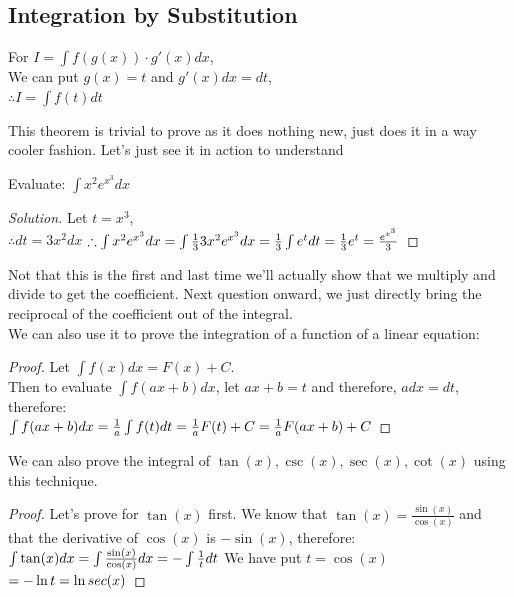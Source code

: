\subsection{Integration by Substitution}
\begin{theorem}
    For $I = \int f(g(x)) \cdot g'(x) dx$,\\
    We can put $g(x)=t$ and $g'(x)dx=dt$,\\
    $\therefore I= \int f(t)dt$
\end{theorem}
This theorem is trivial to prove as it does nothing new, just does it in a way cooler fashion. Let's just see it in action to understand\\
\begin{example}
    Evaluate: $\int x^2 e^{x^3} dx$
\end{example}
\begin{proof}
    [Solution]
    Let $t=x^3$,\\
    $\therefore dt=3x^2dx$
    $\therefore \int x^2 e^{x^3} dx\\
    = \int \frac{1}{3} 3x^2 e^{x^3} dx\\
 = \frac{1}{3} \int e^t dt\\
 = \frac{1}{3} e^t\\
 =\frac{e^{x^3}}{3}$
\end{proof}
Not that this is the first and last time we'll actually show that we multiply and divide to get the coefficient. Next question onward, we just directly bring the reciprocal of the coefficient out of the integral.\\
We can also use it to prove the integration of a function of a linear equation:\\
\begin{proof}
    Let $\int f(x) dx = F(x)+C$.\\
    Then to evaluate $\int f(ax+b) dx$, let $ax+b=t$ and therefore, $adx=dt$, therefore:\\
    $\int f(ax+b) dx\\
    = \frac{1}{a}\int f(t) dt\\
    = \frac{1}{a} F(t) +C\\
    = \frac{1}{a} F(ax+b) + C$
\end{proof}
We can also prove the integral of $\tan(x), \csc(x), \sec(x), \cot(x)$ using this technique.\\
\begin{proof}
    Let's prove for $\tan(x)$ first. We know that $\tan(x)=\frac{\sin(x)}{\cos(x)}$ and that the derivative of $\cos(x)$ is $-\sin(x)$, therefore:\\
    $\int \tan(x) dx\\
    = \int \frac{\sin(x)}{\cos(x)} dx\\
    = -\int \frac{1}{t} dt$ We have put $t=\cos(x)$\\
    $=-\ln{t}\\
    = \ln{sec(x)}$
\end{proof}
